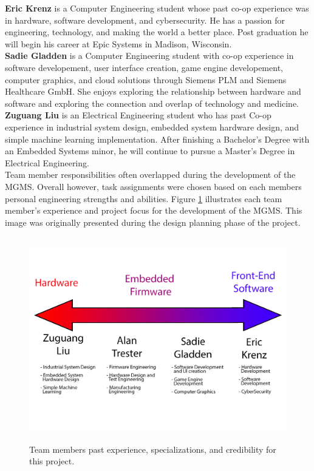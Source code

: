 \documentclass{report}
\begin{document}
\textbf{Eric Krenz} is a Computer Engineering student whose past co-op experience was in hardware, software development, and cybersecurity. He has a passion for engineering, technology, and making the world a better place. Post graduation he will begin his career at Epic Systems in Madison, Wisconsin. \\

\textbf{Sadie Gladden } is a Computer Engineering student with co-op experience in software developement, user interface creation, game engine developement, computer graphics, and cloud solutions through Siemens PLM and Siemens Healthcare GmbH. She enjoys exploring the relationship between hardware and software and exploring the connection and overlap of technology and medicine.\\

\textbf{Zuguang Liu} is an Electrical Engineering student who has past Co-op experience in industrial system design, embedded system hardware design, and simple machine learning implementation. After finishing a Bachelor's Degree with an Embedded Systems minor, he will continue to pursue a Master's Degree in Electrical Engineering.\\

Team member responsibilities often overlapped during the development of the MGMS. Overall however, task assignments were chosen based on each members personal engineering strengths and abilities. Figure \ref{fig:TeamChart} illustrates each team member's experience and project focus for the development of the MGMS. This image was originally presented during the design planning phase of the project.\\

\begin{figure}[H] %
    \centering
    \includegraphics[height=3.5in]{PNGs/Arrow.png}
    \caption{Team members past experience, specializations, and credibility for this project.}
    \label{fig:TeamChart}
\end{figure}
\end{document}
